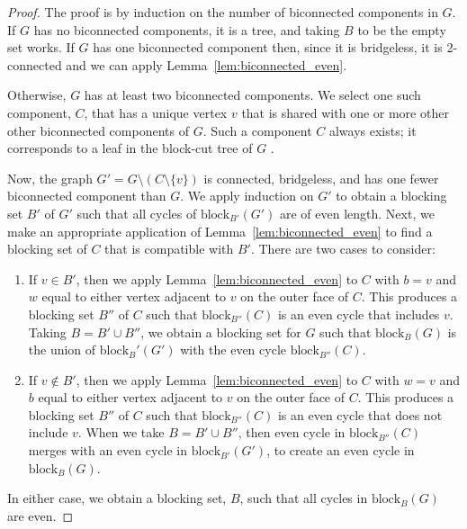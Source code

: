 \documentclass{patmorin}
\newcommand{\block}{\mathrm{block}}
\begin{document}
\begin{proof}
   The proof is by induction on the number of biconnected components in
   $G$.  If $G$ has no biconnected components, it is a tree, and taking
   $B$ to be the empty set works. If $G$ has one biconnected component then,
   since it is bridgeless, it is 2-connected and we can apply Lemma~\ref{lem:biconnected_even}.

   Otherwise, $G$ has at least two biconnected components. We select
   one such component, $C$, that has a unique vertex $v$ that is shared
   with one or more other 
   other biconnected components of $G$. Such a component $C$ always exists; it corresponds to a leaf in the block-cut tree of $G$ \cite{X}.

  Now, the graph $G'=G\setminus(C\setminus \{v\})$ is connected, bridgeless,
  and has one fewer biconnected component than $G$.  We apply induction on $G'$ to obtain
  a blocking set $B'$ of $G'$ such that all cycles of $\block_{B'}(G')$
  are of even length.  
  Next, we make an appropriate application of Lemma~\ref{lem:biconnected_even} to find a
  blocking set of $C$ that is compatible with $B'$.
  There are two cases to consider:
  \begin{enumerate}
    \item If $v\in B'$, then we apply Lemma~\ref{lem:biconnected_even} to $C$ with $b=v$ and $w$ equal to either vertex adjacent to $v$ on the outer face of $C$.  This produces a blocking set $B''$ of $C$ such that $\block_{B''}(C)$ is an even cycle that includes $v$.  Taking $B=B'\cup B''$, we obtain a blocking set for $G$ such that $\block_B(G)$ is the union of $\block_B'(G')$ with the even cycle $\block_{B''}(C)$.

    \item If $v\not\in B'$, then we apply Lemma~\ref{lem:biconnected_even} to $C$ with $w=v$ and $b$ equal to either vertex adjacent to $v$ on the outer face of $C$. This produces a blocking set $B''$ of $C$ such that $\block_{B''}(C)$ is an even cycle that does not include $v$.  When we take 
    $B=B'\cup B''$, then even cycle in $\block_{B''}(C)$ merges with an even cycle in $\block_{B'}(G')$, to create an even cycle in $\block_B(G)$.  
  \end{enumerate}
  In either case, we obtain a blocking set, $B$, such that all cycles in $\block_B(G)$ are even.
\end{proof}
\end{document}
